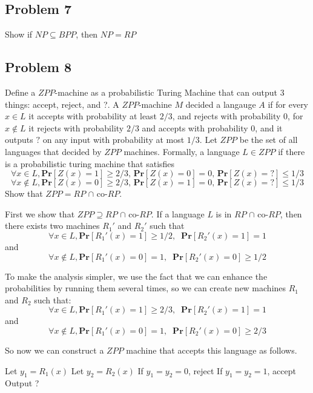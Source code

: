 \documentclass[english]{article}
\begin{document}
\subsection*{Problem 7}
Show if $NP \subseteq BPP$, then $NP = RP$

\subsection*{Problem 8}
Define a $ZPP$-machine as a probabilistic Turing Machine that can output 3 things: accept, reject, and ?.
A $ZPP$-machine $M$ decided a langauge $A$ if for every $x \in L$ it accepts with probability at least $2/3$, and
rejects with probability 0, for $x \notin L$ it rejects with probability $2/3$ and accepts with probability 0, and it
outputs $?$ on any input with probability at most $1/3$. Let $ZPP$ be the set of all languages that decided by
$ZPP$ machines. Formally, a language $L \in ZPP$ if there is a probabilistic turing machine that satisfies
\[\forall x \in L, \mathbf{Pr}[Z(x) = 1] \ge 2/3,\,\mathbf{Pr}[Z(x) = 0] = 0,\,\mathbf{Pr}[Z(x) = ?] \le 1/3 \]
\[\forall x \notin L, \mathbf{Pr}[Z(x) = 0] \ge 2/3,\,\mathbf{Pr}[Z(x) = 1] = 0,\,\mathbf{Pr}[Z(x) = ?] \le 1/3\]
Show that $ZPP = RP$ $\cap$ co-$RP$.

First we show that $ZPP \supseteq RP$ $\cap$ co-$RP$. 
If a language $L$ is in $RP$ $\cap$ co-$RP$, then there exists two machines $R_1'$ and $R_2'$ such that
\[\forall x \in L, \mathbf{Pr}[R_1'(x) = 1] \ge 1/2, \;\; \mathbf{Pr}[R_2'(x) = 1] = 1\]
and
\[\forall x \notin L, \mathbf{Pr}[R_1'(x) = 0] = 1, \;\; \mathbf{Pr}[R_2'(x) = 0] \ge 1/2\]

To make the analysis simpler, we use the fact that we can enhance the probabilities by running them several times,
so we can create new machines $R_1$ and $R_2$ such that:
\[\forall x \in L, \mathbf{Pr}[R_1'(x) = 1] \ge 2/3, \;\; \mathbf{Pr}[R_2'(x) = 1] = 1\]
and
\[\forall x \notin L, \mathbf{Pr}[R_1'(x) = 0] = 1, \;\; \mathbf{Pr}[R_2'(x) = 0] \ge 2/3\]

So now we can construct a $ZPP$ machine that accepts this language as follows. 
\begin{algorithmic}
  \State Let $y_1 = R_1(x)$
  \State Let $y_2 = R_2(x)$
  \State If $y_1 = y_2 = 0$, reject
  \State If $y_1 = y_2 = 1$, accept
  \State Output ?
\EndFunction 
\end{algorithmic}
\end{document}
